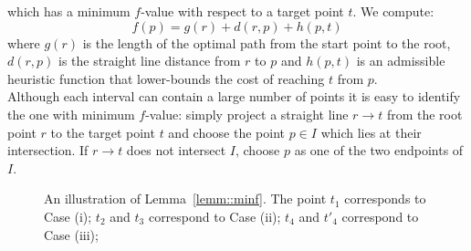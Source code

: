 which has a minimum $f$-value with respect to a target point $t$.
We compute: 
\begin{equation}
\label{eq::f}
f(p) = g(r) + d(r, p) + h(p, t)
\end{equation}
where $g(r)$ is the length of the optimal path from the start point to 
the root, $d(r, p)$ is the straight line distance from $r$ to $p$
and $h(p, t)$ is an admissible heuristic function that lower-bounds the cost of
reaching $t$ from $p$.
\\
Although each interval can contain a large number of points it is easy to
identify the one with minimum $f$-value: 
simply project a straight line $r
\rightarrow t$ from the root point $r$ to the target point $t$ and choose the
point $p \in I$ which lies at their intersection.  If $r \rightarrow t$ does not
intersect $I$, choose $p$ as one of the two endpoints of $I$.

\begin{figure}[tb]
  \begin{center}
    
  \end{center}
  \caption{An illustration of Lemma~\ref{lemm::minf}. The point $t_1$ corresponds 
to Case (i); $t_2$ and $t_3$ correspond to Case (ii); $t_4$ and $t'_4$ correspond
to Case (iii);}
\label{fig::minf}
\end{figure}

